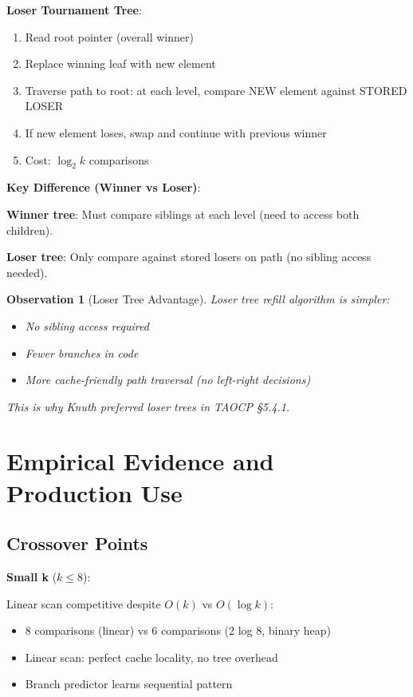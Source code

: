 \documentclass[11pt]{article}
\newtheorem{observation}{Observation}
\begin{document}
\textbf{Loser Tournament Tree}:
\begin{enumerate}
    \item Read root pointer (overall winner)
    \item Replace winning leaf with new element
    \item Traverse path to root: at each level, compare NEW element against STORED LOSER
    \item If new element loses, swap and continue with previous winner
    \item Cost: $\log_2 k$ comparisons
\end{enumerate}

\textbf{Key Difference (Winner vs Loser)}:

\textbf{Winner tree}: Must compare siblings at each level (need to access both children).

\textbf{Loser tree}: Only compare against stored losers on path (no sibling access needed).

\begin{observation}[Loser Tree Advantage]
Loser tree refill algorithm is simpler:
\begin{itemize}
    \item No sibling access required
    \item Fewer branches in code
    \item More cache-friendly path traversal (no left-right decisions)
\end{itemize}

This is why Knuth preferred loser trees in TAOCP §5.4.1.
\end{observation}

\section{Empirical Evidence and Production Use}

\subsection{Crossover Points}

\textbf{Small k} ($k \leq 8$):

Linear scan competitive despite $O(k)$ vs $O(\log k)$:
\begin{itemize}
    \item 8 comparisons (linear) vs 6 comparisons (2 log 8, binary heap)
    \item Linear scan: perfect cache locality, no tree overhead
    \item Branch predictor learns sequential pattern
\end{itemize}
\end{document}
